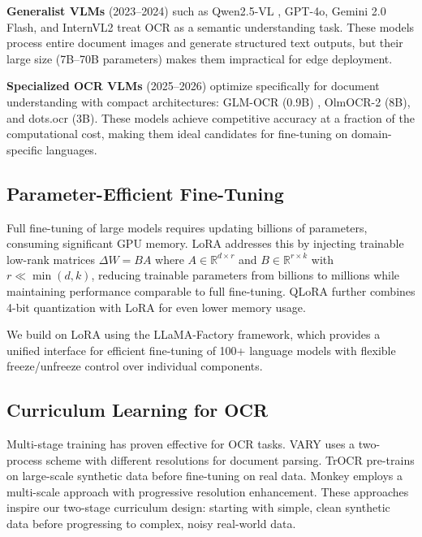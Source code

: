 \documentclass[11pt]{article}
\begin{document}
\textbf{Generalist VLMs} (2023--2024) such as Qwen2.5-VL \cite{qwen2vl}, GPT-4o, Gemini 2.0 Flash, and InternVL2 \cite{internvl2024} treat OCR as a semantic understanding task. 
These models process entire document images and generate structured text outputs, but their large size (7B--70B parameters) makes them impractical for edge deployment.

\textbf{Specialized OCR VLMs} (2025--2026) optimize specifically for document understanding with compact architectures: GLM-OCR (0.9B) \cite{glm-ocr}, OlmOCR-2 (8B), and dots.ocr (3B). 
These models achieve competitive accuracy at a fraction of the computational cost, making them ideal candidates for fine-tuning on domain-specific languages.

\subsection{Parameter-Efficient Fine-Tuning}

Full fine-tuning of large models requires updating billions of parameters, consuming significant GPU memory. 
LoRA \cite{hu2022lora} addresses this by injecting trainable low-rank matrices $\Delta W = BA$ where $A \in \mathbb{R}^{d \times r}$ and $B \in \mathbb{R}^{r \times k}$ with $r \ll \min(d,k)$, reducing trainable parameters from billions to millions while maintaining performance comparable to full fine-tuning. 
QLoRA \cite{dettmers2024qlora} further combines 4-bit quantization with LoRA for even lower memory usage.

We build on LoRA using the LLaMA-Factory \cite{llamafactory2024} framework, which provides a unified interface for efficient fine-tuning of 100+ language models with flexible freeze/unfreeze control over individual components.

\subsection{Curriculum Learning for OCR}

Multi-stage training has proven effective for OCR tasks. 
VARY \cite{vary2024} uses a two-process scheme with different resolutions for document parsing. 
TrOCR \cite{trocr2023} pre-trains on large-scale synthetic data before fine-tuning on real data. 
Monkey \cite{monkey2024} employs a multi-scale approach with progressive resolution enhancement. 
These approaches inspire our two-stage curriculum design: starting with simple, clean synthetic data before progressing to complex, noisy real-world data.
\end{document}

